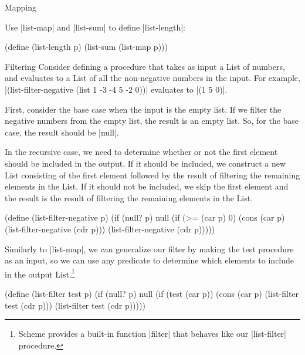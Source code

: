 \begin{schemeregion}
\begin{examplenobar}{Mapping}
\beforeex
\begin{exercise}
Use \scheme|list-map| and \scheme|list-sum| to define \scheme|list-length|: 
\begin{schemedisplay}
(define (list-length p) (list-sum (list-map \fillspace p)))
\end{schemedisplay}
\solution{\LATER{}}
\end{exercise}
\afterex

\end{examplenobar}

\begin{examplenobar}{Filtering}\label{example:filter}  Consider defining a procedure that takes as input a List of numbers, and evaluates to a List of all the non-negative numbers in the input.  For example, \scheme|(list-filter-negative (list 1 -3 -4 5 -2 0))| evaluates to \schemeresult|(1 5 0)|.

First, consider the base case when the input is the empty list.  If we filter the negative numbers from the empty list, the result is an empty list.  So, for the base case, the result should be \schemeresult|null|.  

In the recursive case, we need to determine whether or not the first element should be included in the output.  If it should be included, we construct a new List consisting of the first element followed by the result of filtering the remaining elements in the List.  If it should not be included, we skip the first element and the result is the result of filtering the remaining elements in the List.

\begin{schemedisplay}
(define (list-filter-negative p)
  (if (null? p) null
      (if (>= (car p) 0)
          (cons (car p) (list-filter-negative (cdr p)))
          (list-filter-negative (cdr p)))))
\end{schemedisplay}

Similarly to \scheme|list-map|, we can generalize our filter by making the test procedure as an input, so we can use any predicate to determine which elements to include in the output List.\footnote{Scheme provides a built-in function \scheme|filter| that behaves like our \scheme|list-filter| procedure.}

\begin{schemedisplay}
(define (list-filter test p)
  (if (null? p) null
      (if (test (car p))
          (cons (car p) (list-filter test (cdr p)))
          (list-filter test (cdr p)))))
\end{schemedisplay}


\end{examplenobar}
\end{schemeregion}
